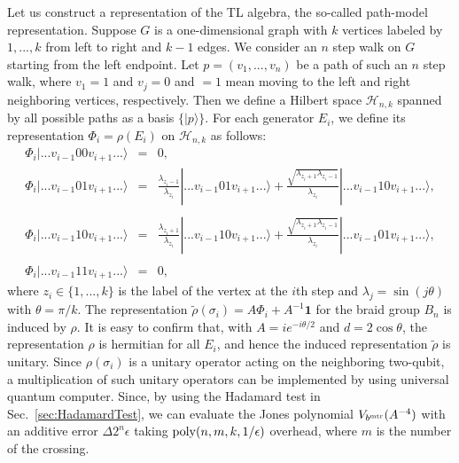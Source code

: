 Let us construct 
a representation of the TL algebra,
the so-called path-model representation.
Suppose $G$ is a one-dimensional graph with $k$ vertices
labeled by $1,...,k$ from left to right and $k-1$ edges.
We consider an $n$ step walk on $G$ starting from the left endpoint.
Let $p=(v_1,...,v_n)$ be a path of such an $n$ step walk,
where $v_1=1$ and $v_j =0$ and $=1$ mean moving to the left and right neighboring vertices,
respectively.
Then we define a Hilbert space $\mathcal{H}_{n,k}$ 
spanned by all possible paths as a basis $\{ |p\rangle\}$.
For each generator $E_i$, we define 
its representation $\Phi_i =\rho(E_i)$ on $\mathcal{H}_{n,k}$
as follows:
\begin{eqnarray}
\Phi _i | ... v_{i-1} 00 v_{i+1}...\rangle &=& 
0,
\\
\Phi _i | ... v_{i-1} 01 v_{i+1}...\rangle &=& 
\frac{\lambda_{z_i -1}}{\lambda_{z_i}}| ... v_{i-1} 01 v_{i+1}...\rangle+
\frac{\sqrt{\lambda_{z_i +1} \lambda_{z_i -1}}}{\lambda_{z_i}}
| ... v_{i-1} 10 v_{i+1}...\rangle,
\nonumber \\
\\
\Phi _i | ... v_{i-1} 10 v_{i+1}...\rangle &=&
\frac{\lambda_{z_i +1}}{\lambda_{z_i}}| ... v_{i-1} 10 v_{i+1}...\rangle+
\frac{\sqrt{\lambda_{z_i +1} \lambda_{z_i -1}}}{\lambda_{z_i}}
|... v_{i-1} 01 v_{i+1}...\rangle,
\nonumber \\
\\
\Phi _i |... v_{i-1} 11 v_{i+1}...\rangle &=& 0,
\end{eqnarray}
where $z_i \in \{1,...,k\}$ is the label of the vertex at the $i$th step
and $\lambda _j = \sin( j\theta)$ with $\theta =\pi  / k$. 
The representation $\tilde \rho (\sigma _i)=A\Phi _i +A^{-1} \mathbf{1}$ 
for the braid group $B_n$ is induced
by $\rho$.
It is easy to confirm that,
with $A=ie^{-i \theta /2}$ and $d=2\cos\theta$,
the representation $\rho$ is hermitian for all $E_i$, and hence
the induced representation $\tilde \rho$ is unitary.
Since $\rho (\sigma _i)$ is a unitary operator
acting on the neighboring two-qubit,
a multiplication of such unitary operators
can be implemented by using universal quantum computer.
Since, by using the Hadamard test in Sec.~\ref{sec:HadamardTest},
we can evaluate the Jones polynomial $V_{b^{\rm mtr}}(A^{-4})$
with an additive error $\Delta 2^{n} \epsilon$
taking ${\rm poly}(n,m,k,1/\epsilon)$ overhead,
where $m$ is the number of the crossing.


